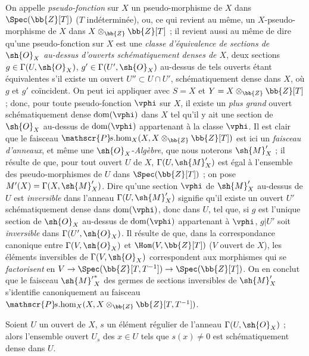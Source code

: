 \begin{env}[20.2.8]
On appelle \emph{pseudo-fonction} sur $X$ un pseudo-morphisme de $X$ dans $\Spec(\bb{Z}[T])$ ($T$ indéterminée), ou, ce qui revient au même, un $X$-pseudo-morphisme de $X$ dans $X\otimes_{\bb{Z}}\bb{Z}[T]$ ; il revient aussi au même  de dire qu'une pseudo-fonction sur $X$ est une \emph{classe d'équivalence de sections de $\sh{O}_X$ au-dessus d'ouverts schématiquement denses de $X$}, deux sections $g\in\Gamma(U,\sh{O}_X)$, $g'\in\Gamma(U',\sh{O}_X)$ au-dessus de tels ouverts étant équivalentes s'il existe un ouvert $U''\subset U\cap U'$, schématiquement dense dans $X$, où $g$ et $g'$ coïncident.
On peut ici appliquer  avec $S=X$ et $Y=X\otimes_{\bb{Z}}\bb{Z}[T]$ ; donc, pour toute pseudo-fonction $\vphi$ sur $X$, il existe un \emph{plus grand} ouvert schématiquement dense $\operatorname{dom}(\vphi)$ dans $X$ tel qu'il y ait une section de $\sh{O}_X$ au-dessus de $\operatorname{dom}(\vphi)$ appartenant à la classe $\vphi$.
Il est clair que le faisceau $\mathscr{P}\!s.\!\operatorname{hom}_X(X,X\otimes_{\bb{Z}}\bb{Z}[T])$ est ici un \emph{faisceau d'anneaux}, et même une $\sh{O}_X$-\emph{Algèbre}, que nous noterons $\sh{M}'_X$ ; il résulte de  que, pour tout ouvert $U$ de $X$, $\Gamma(U,\sh{M}'_X)$ est égal à l'ensemble des pseudo-morphismes de $U$ dans $\Spec(\bb{Z}[T])$ ; on pose $M'(X)=\Gamma(X,\sh{M}'_X)$.
Dire qu'une section $\vphi$ de $\sh{M}'_X$ au-dessus de $U$ est \emph{inversible} dans l'anneau $\Gamma(U,\sh{M}'_X)$ signifie qu'il existe un ouvert $U'$ schématiquement dense dans $\operatorname{dom}(\vphi)$, donc dans $U$, tel que, si $g$ est l'unique section de $\sh{O}_X$ au-dessus de $\operatorname{dom}(\vphi)$ appartenant à $\vphi$, $g|U'$ soit \emph{inversible} dans $\Gamma(U',\sh{O}_X)$.
Il résulte de  que, dans la correspondance canonique entre $\Gamma(V,\sh{O}_X)$ et $\Hom(V,\bb{Z}[T])$ ($V$ ouvert de $X$), les éléments inversibles de $\Gamma(V,\sh{O}_X)$ correspondent aux morphismes qui se
\emph{factorisent} en $V\to\Spec(\bb{Z}[T,T^{-1}])\to\Spec(\bb{Z}[T])$.
On en conclut que le faisceau ${\sh{M}'}^*_X$ des germes de sections inversibles de $\sh{M}'_X$ s'identifie canoniquement au faisceau $\mathscr{P}\!s.\!\operatorname{hom}_X(X,X\otimes_{\bb{Z}}\bb{Z}[T,T^{-1}])$.
\end{env}

\begin{lemma}[20.2.9]
\label{IV.20.2.9}
Soient $U$ un ouvert de $X$, $s$ un élément régulier de l'anneau $\Gamma(U,\sh{O}_X)$ ; alors l'ensemble ouvert $U_s$ des $x\in U$ tels que $s(x)\neq0$ est schématiquement dense dans $U$.
\end{lemma}

